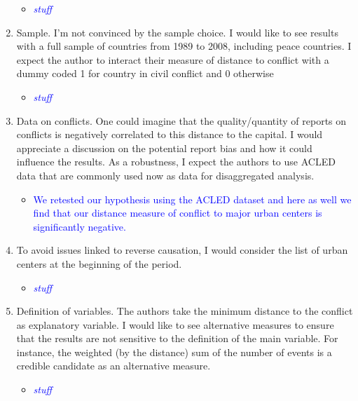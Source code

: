 \begin{enumerate}
\begin{itemize}
\item \textcolor{blue}{\emph{stuff}}
\end{itemize}

\item Sample. I’m not convinced by the sample choice. I would like to see results with a full sample of countries from 1989 to 2008, including peace countries. I expect the author to interact their measure of distance to conflict with a dummy coded 1 for country in civil conflict and 0 otherwise

\begin{itemize}
\item \textcolor{blue}{\emph{stuff}}
\end{itemize}

\item Data on conflicts. One could imagine that the quality/quantity of reports on conflicts is negatively correlated to this distance to the capital. I would appreciate a discussion on the potential report bias and how it could influence the results. As a robustness, I expect the authors to use ACLED data that are commonly used now as data for disaggregated analysis.

\begin{itemize}
\item \textcolor{blue}{
	We retested our hypothesis using the ACLED dataset and here as well we find that our distance measure of conflict to major urban centers is significantly negative. 
}
\end{itemize}

\item To avoid issues linked to reverse causation, I would consider the list of urban centers
at the beginning of the period.

\begin{itemize}
\item \textcolor{blue}{\emph{stuff}}
\end{itemize}

\item Definition of variables. The authors take the minimum distance to the conflict as explanatory variable. I would like to see alternative measures to ensure that the results are not sensitive to the definition of the main variable. For instance, the weighted (by the distance) sum of the number of events is a credible candidate as an alternative measure.

\begin{itemize}
\item \textcolor{blue}{\emph{stuff}}
\end{itemize}

\end{enumerate}

